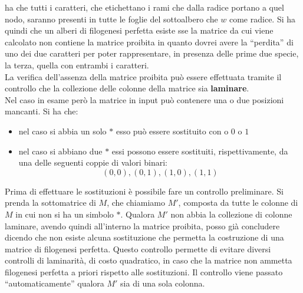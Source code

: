 \documentclass[a4paper,12pt, oneside]{book}
\begin{document}
ha che tutti i caratteri, che etichettano i rami che dalla radice portano a quel
nodo, saranno presenti in tutte le foglie del sottoalbero che $w$ come
radice. Si ha quindi che un alberi di filogenesi perfetta esiste sse la matrice
da cui viene calcolato non contiene la matrice proibita in quanto dovrei avere
la ``perdita'' di uno dei due caratteri per poter rappresentare, in presenza
delle prime due specie, la terza, quella con entrambi i caratteri. \\
La verifica dell'assenza della matrice proibita può essere effettuata tramite il
controllo che la collezione delle colonne della matrice sia \textbf{laminare}.\\
Nel caso in esame però la matrice in input può contenere una o due posizioni
mancanti. Si ha che:
\begin{itemize}
  \item nel caso si abbia un solo $*$ esso può essere sostituito con o $0$ o $1$
  \item nel caso si abbiano due $*$ essi possono essere sostituiti,
  rispettivamente, da una delle seguenti coppie di valori binari:
  \[(0,0),(0,1),(1,0),(1,1)\]
\end{itemize}
Prima di effettuare le sostituzioni è possibile fare un controllo preliminare.
Si prenda la sottomatrice di $M$, che chiamiamo $M'$, composta da tutte le
colonne di $M$ in cui non si ha un simbolo $*$. Qualora $M'$ non abbia la
collezione di colonne laminare, avendo quindi all'interno la matrice proibita,
posso già concludere dicendo che non esiste alcuna sostituzione che permetta la
costruzione di una matrice di filogenesi perfetta. Questo controllo permette di
evitare diversi controlli di laminarità, di costo quadratico, in caso che la
matrice non ammetta filogenesi perfetta a priori rispetto alle sostituzioni. Il
controllo viene passato ``automaticamente'' qualora $M'$ sia di una sola
colonna. 
\end{document}
